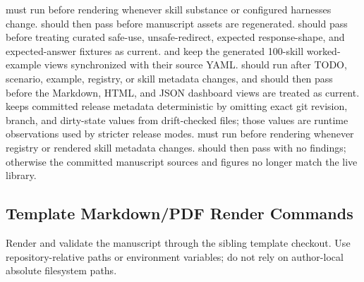 \documentclass[
]{article}
\begin{document}
 must run before rendering whenever skill
substance or configured harnesses change.
 should then pass before manuscript
assets are regenerated.  should pass before
treating curated safe-use, unsafe-redirect, expected response-shape, and
expected-answer fixtures as current.  and
 keep the generated 100-skill worked-example
views synchronized with their source YAML. 
should run after TODO, scenario, example, registry, or skill metadata
changes, and  should then pass before the
Markdown, HTML, and JSON dashboard views are treated as current.
 keeps committed release metadata
deterministic by omitting exact git revision, branch, and dirty-state
values from drift-checked files; those values are runtime observations
used by stricter release modes. 
must run before rendering whenever registry or rendered skill metadata
changes.  should then pass with no
findings; otherwise the committed manuscript sources and figures no
longer match the live library.

\subsection{Template Markdown/PDF Render
Commands}\label{template-markdownpdf-render-commands}

Render and validate the manuscript through the sibling template
checkout. Use repository-relative paths or environment variables; do not
rely on author-local absolute filesystem paths.
\end{document}
